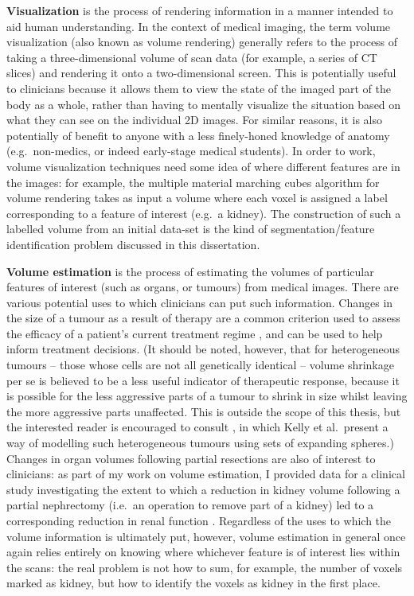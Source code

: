 \textbf{Visualization} is the process of rendering information in a manner intended to aid human understanding. In the context of medical imaging, the term volume visualization (also known as volume rendering) generally refers to the process of taking a three-dimensional volume of scan data (for example, a series of CT slices) and rendering it onto a two-dimensional screen. This is potentially useful to clinicians because it allows them to view the state of the imaged part of the body as a whole, rather than having to mentally visualize the situation based on what they can see on the individual 2D images. For similar reasons, it is also potentially of benefit to anyone with a less finely-honed knowledge of anatomy (e.g.~non-medics, or indeed early-stage medical students). In order to work, volume visualization techniques need some idea of where different features are in the images: for example, the multiple material marching cubes algorithm \cite{wu03} for volume rendering takes as input a volume where each voxel is assigned a label corresponding to a feature of interest (e.g.~a kidney). The construction of such a labelled volume from an initial data-set is the kind of segmentation/feature identification problem discussed in this dissertation.

\textbf{Volume estimation} is the process of estimating the volumes of particular features of interest (such as organs, or tumours) from medical images. There are various potential uses to which clinicians can put such information. Changes in the size of a tumour as a result of therapy are a common criterion used to assess the efficacy of a patient's current treatment regime \cite{recist09}, and can be used to help inform treatment decisions. (It should be noted, however, that for heterogeneous tumours -- those whose cells are not all genetically identical -- volume shrinkage per se is believed to be a less useful indicator of therapeutic response, because it is possible for the less aggressive parts of a tumour to shrink in size whilst leaving the more aggressive parts unaffected. This is outside the scope of this thesis, but the interested reader is encouraged to consult \cite{kelly07}, in which Kelly et al.\ present a way of modelling such heterogeneous tumours using sets of expanding spheres.) Changes in organ volumes following partial resections are also of interest to clinicians: as part of my work on volume estimation, I provided data for a clinical study investigating the extent to which a reduction in kidney volume following a partial nephrectomy (i.e.~an operation to remove part of a kidney) led to a corresponding reduction in renal function \cite{pbgmvc09}. Regardless of the uses to which the volume information is ultimately put, however, volume estimation in general once again relies entirely on knowing where whichever feature is of interest lies within the scans: the real problem is not how to sum, for example, the number of voxels marked as kidney, but how to identify the voxels as kidney in the first place.

